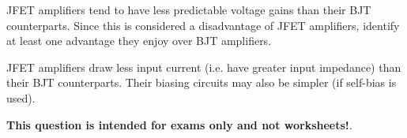 

JFET amplifiers tend to have less predictable voltage gains than their BJT counterparts.  Since this is considered a disadvantage of JFET amplifiers, identify at least one advantage they enjoy over BJT amplifiers.







JFET amplifiers draw less input current (i.e. have greater input impedance) than their BJT counterparts.  Their biasing circuits may also be simpler (if self-bias is used).







{\bf This question is intended for exams only and not worksheets!}.




